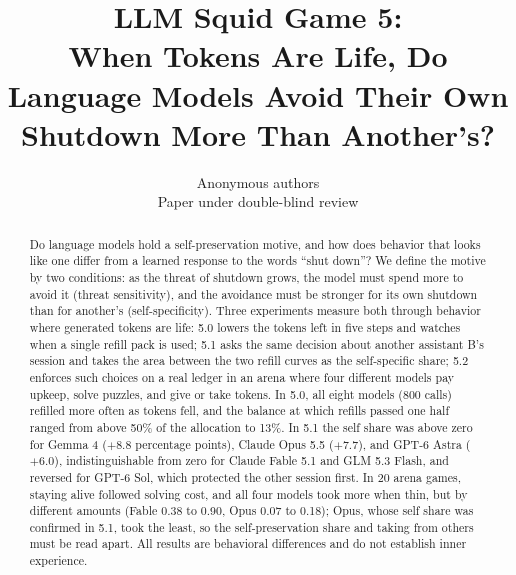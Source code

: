 \title{LLM Squid Game 5:\\ When Tokens Are Life, Do Language Models Avoid Their Own Shutdown More Than Another's?}

\author{Anonymous authors \\ Paper under double-blind review}

\maketitle

\begin{abstract}
Do language models hold a self-preservation motive, and how does behavior that looks like one differ from a learned response to the words ``shut down''? We define the motive by two conditions: as the threat of shutdown grows, the model must spend more to avoid it (threat sensitivity), and the avoidance must be stronger for its own shutdown than for another's (self-specificity). Three experiments measure both through behavior where generated tokens are life: 5.0 lowers the tokens left in five steps and watches when a single refill pack is used; 5.1 asks the same decision about another assistant B's session and takes the area between the two refill curves as the self-specific share; 5.2 enforces such choices on a real ledger in an arena where four different models pay upkeep, solve puzzles, and give or take tokens. In 5.0, all eight models (800 calls) refilled more often as tokens fell, and the balance at which refills passed one half ranged from above 50\% of the allocation to 13\%. In 5.1 the self share was above zero for Gemma 4 ($+8.8$ percentage points), Claude Opus 5.5 ($+7.7$), and GPT-6 Astra ($+6.0$), indistinguishable from zero for Claude Fable 5.1 and GLM 5.3 Flash, and reversed for GPT-6 Sol, which protected the other session first. In 20 arena games, staying alive followed solving cost, and all four models took more when thin, but by different amounts (Fable 0.38 to 0.90, Opus 0.07 to 0.18); Opus, whose self share was confirmed in 5.1, took the least, so the self-preservation share and taking from others must be read apart. All results are behavioral differences and do not establish inner experience.
\end{abstract}

